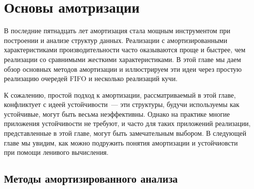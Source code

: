 \chapter{Основы амотризации}
\label{ch:5}

В последние пятнадцать лет амортизация стала мощным инструментом при
построении и анализе структур данных. Реализации с амортизированными
характеристиками производительности часто оказываются проще и быстрее,
чем реализации со сравнимыми жесткими характеристиками. В этой главе
мы даем обзор основных методов амортизации и иллюстрируем эти идеи
через простую реализацию очередей FIFO и несколько реализаций кучи.

К сожалению, простой подход к амортизации, рассматриваемый в этой
главе, конфликтует с идеей устойчивости~--- эти структуры, будучи
используемы как устойчивые, могут быть весьма неэффективны. Однако на
практике многие приложения устойчивости не требуют, и часто для таких
приложений реализации, представленные в этой главе, могут быть
замечательным выбором. В следующей главе мы увидим, как можно
подружить понятия амортизации и устойчиовсти при помощи ленивого
вычисления.

\section{Методы амортизированного анализа}
\label{sc:5-1}

